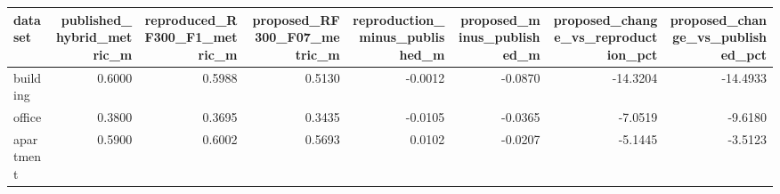 \begin{tabular}{lrrrrrrr}
\toprule
dataset & published\_hybrid\_metric\_m & reproduced\_RF300\_F1\_metric\_m & proposed\_RF300\_F07\_metric\_m & reproduction\_minus\_published\_m & proposed\_minus\_published\_m & proposed\_change\_vs\_reproduction\_pct & proposed\_change\_vs\_published\_pct \\
\midrule
building & 0.6000 & 0.5988 & 0.5130 & -0.0012 & -0.0870 & -14.3204 & -14.4933 \\
office & 0.3800 & 0.3695 & 0.3435 & -0.0105 & -0.0365 & -7.0519 & -9.6180 \\
apartment & 0.5900 & 0.6002 & 0.5693 & 0.0102 & -0.0207 & -5.1445 & -3.5123 \\
\bottomrule
\end{tabular}
